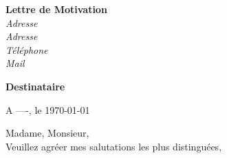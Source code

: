 % 
% 






\sffamily
\hfill
\begin{flushleft}
  {\bfseries Lettre de Motivation}\\[.35ex]
  \small\itshape
  Adresse\\
  Adresse\\[.35ex]
  Téléphone\\
  Mail
\end{flushleft}


\begin{flushright}
  {\bfseries Destinataire}\\[.35ex]
  \small\itshape
\end{flushright}
\hfill

\begin{flushright}
A ----, le \today \\
\end{flushright}

Madame, Monsieur,\\

Veuillez agréer mes salutations les plus distinguées,\\


\vfill

